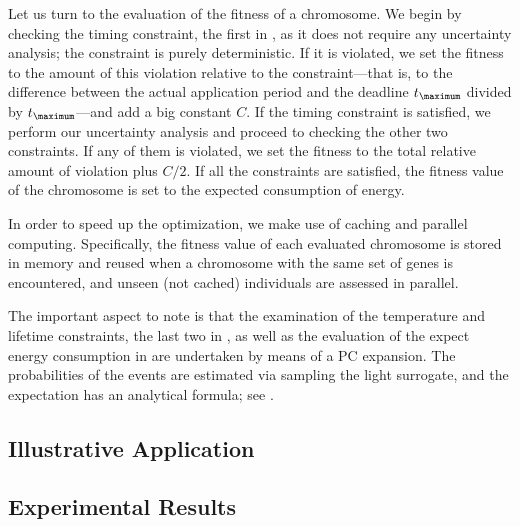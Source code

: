Let us turn to the evaluation of the fitness of a chromosome. We begin by
checking the timing constraint, the first in , as it
does not require any uncertainty analysis; the constraint is purely
deterministic. If it is violated, we set the fitness to the amount of this
violation relative to the constraint---that is, to the difference between the
actual application period and the deadline $t_\maximum$ divided by
$t_\maximum$---and add a big constant $C$. If the timing constraint is
satisfied, we perform our uncertainty analysis and proceed to checking the other
two constraints. If any of them is violated, we set the fitness to the total
relative amount of violation plus $C / 2$. If all the constraints are satisfied,
the fitness value of the chromosome is set to the expected consumption of
energy.

In order to speed up the optimization, we make use of caching and parallel
computing. Specifically, the fitness value of each evaluated chromosome is
stored in memory and reused when a chromosome with the same set of genes is
encountered, and unseen (not cached) individuals are assessed in parallel.

The important aspect to note is that the examination of the temperature and
lifetime constraints, the last two in , as well as the
evaluation of the expect energy consumption in  are
undertaken by means of a \ac{PC} expansion. The probabilities of the events are
estimated via sampling the light surrogate, and the expectation has an
analytical formula; see .

\subsection{Illustrative Application}

\subsection{Experimental Results}
